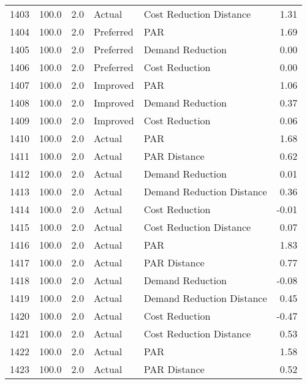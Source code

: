 \begin{longtable}{lrrllr}
1403 &        100.0 &     2.0 &         Actual &    Cost Reduction Distance &   1.31 \\
1404 &        100.0 &     2.0 &      Preferred &                        PAR &   1.69 \\
1405 &        100.0 &     2.0 &      Preferred &           Demand Reduction &   0.00 \\
1406 &        100.0 &     2.0 &      Preferred &             Cost Reduction &   0.00 \\
1407 &        100.0 &     2.0 &       Improved &                        PAR &   1.06 \\
1408 &        100.0 &     2.0 &       Improved &           Demand Reduction &   0.37 \\
1409 &        100.0 &     2.0 &       Improved &             Cost Reduction &   0.06 \\
1410 &        100.0 &     2.0 &         Actual &                        PAR &   1.68 \\
1411 &        100.0 &     2.0 &         Actual &               PAR Distance &   0.62 \\
1412 &        100.0 &     2.0 &         Actual &           Demand Reduction &   0.01 \\
1413 &        100.0 &     2.0 &         Actual &  Demand Reduction Distance &   0.36 \\
1414 &        100.0 &     2.0 &         Actual &             Cost Reduction &  -0.01 \\
1415 &        100.0 &     2.0 &         Actual &    Cost Reduction Distance &   0.07 \\
1416 &        100.0 &     2.0 &         Actual &                        PAR &   1.83 \\
1417 &        100.0 &     2.0 &         Actual &               PAR Distance &   0.77 \\
1418 &        100.0 &     2.0 &         Actual &           Demand Reduction &  -0.08 \\
1419 &        100.0 &     2.0 &         Actual &  Demand Reduction Distance &   0.45 \\
1420 &        100.0 &     2.0 &         Actual &             Cost Reduction &  -0.47 \\
1421 &        100.0 &     2.0 &         Actual &    Cost Reduction Distance &   0.53 \\
1422 &        100.0 &     2.0 &         Actual &                        PAR &   1.58 \\
1423 &        100.0 &     2.0 &         Actual &               PAR Distance &   0.52 \\

\end{longtable}
